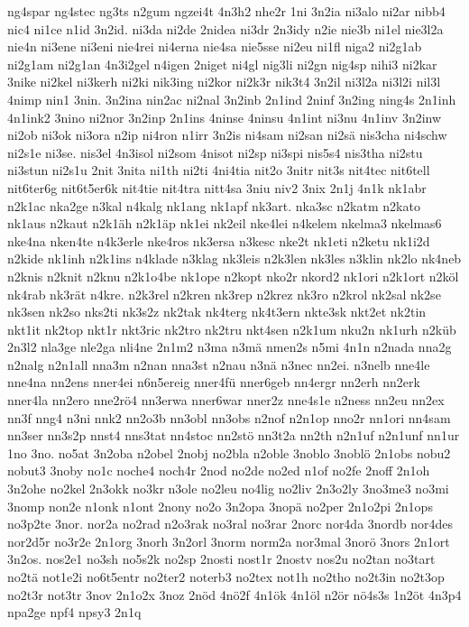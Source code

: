 {ng4spar
ng4stec
ng3ts
n2gum
ngzei4t
4n3h2
nhe2r
1ni
3n2ia
ni3alo
ni2ar
nibb4
nic4
ni1ce
n1id
3n2id.
ni3da
ni2de
2nidea
ni3dr
2n3idy
n2ie
nie3b
ni1el
nie3l2a
nie4n
ni3ene
ni3eni
nie4rei
ni4erna
nie4sa
nie5sse
ni2eu
ni1fl
niga2
ni2g1ab
ni2g1am
ni2g1an
4n3i2gel
n4igen
2niget
ni4gl
nig3li
ni2gn
nig4sp
nihi3
ni2kar
3nike
ni2kel
ni3kerh
ni2ki
nik3ing
ni2kor
ni2k3r
nik3t4
3n2il
ni3l2a
ni3l2i
nil3l
4nimp
nin1
3nin.
3n2ina
nin2ac
ni2nal
3n2inb
2n1ind
2ninf
3n2ing
ning4s
2n1inh
4n1ink2
3nino
ni2nor
3n2inp
2n1ins
4ninse
4ninsu
4n1int
ni3nu
4n1inv
3n2inw
ni2ob
ni3ok
ni3ora
n2ip
ni4ron
n1irr
3n2is
ni4sam
ni2san
ni2sä
nis3cha
ni4schw
ni2s1e
ni3se.
nis3el
4n3isol
ni2som
4nisot
ni2sp
ni3spi
nis5s4
nis3tha
ni2stu
ni3stun
ni2s1u
2nit
3nita
ni1th
ni2ti
4ni4tia
nit2o
3nitr
nit3s
nit4tec
nit6tell
nit6ter6g
nit6t5er6k
nit4tie
nit4tra
nitt4sa
3niu
niv2
3nix
2n1j
4n1k
nk1abr
n2k1ac
nka2ge
n3kal
n4kalg
nk1ang
nk1apf
nk3art.
nka3sc
n2katm
n2kato
nk1aus
n2kaut
n2k1äh
n2k1äp
nk1ei
nk2eil
nke4lei
n4kelem
nkelma3
nkelmas6
nke4na
nken4te
n4k3erle
nke4ros
nk3ersa
n3kesc
nke2t
nk1eti
n2ketu
nk1i2d
n2kide
nk1inh
n2k1ins
n4klade
n3klag
nk3leis
n2k3len
nk3les
n3klin
nk2lo
nk4neb
n2knis
n2knit
n2knu
n2k1o4be
nk1ope
n2kopt
nko2r
nkord2
nk1ori
n2k1ort
n2köl
nk4rab
nk3rät
n4kre.
n2k3rel
n2kren
nk3rep
n2krez
nk3ro
n2krol
nk2sal
nk2se
nk3sen
nk2so
nks2ti
nk3s2z
nk2tak
nk4terg
nk4t3ern
nkte3sk
nkt2et
nk2tin
nkt1it
nk2top
nkt1r
nkt3ric
nk2tro
nk2tru
nkt4sen
n2k1um
nku2n
nk1urh
n2küb
2n3l2
nla3ge
nle2ga
nli4ne
2n1m2
n3ma
n3mä
nmen2s
n5mi
4n1n
n2nada
nna2g
n2nalg
n2n1all
nna3m
n2nan
nna3st
n2nau
n3nä
n3nec
nn2ei.
n3nelb
nne4le
nne4na
nn2ens
nner4ei
n6n5ereig
nner4fü
nner6geb
nn4ergr
nn2erh
nn2erk
nner4la
nn2ero
nne2rö4
nn3erwa
nner6war
nner2z
nne4s1e
n2ness
nn2eu
nn2ex
nn3f
nng4
n3ni
nnk2
nn2o3b
nn3obl
nn3obs
n2nof
n2n1op
nno2r
nn1ori
nn4sam
nn3ser
nn3s2p
nnst4
nns3tat
nn4stoc
nn2stö
nn3t2a
nn2th
n2n1uf
n2n1unf
nn1ur
1no
3no.
no5at
3n2oba
n2obel
2nobj
no2bla
n2oble
3noblo
3noblö
2n1obs
nobu2
nobut3
3noby
no1c
noche4
noch4r
2nod
no2de
no2ed
n1of
no2fe
2noff
2n1oh
3n2ohe
no2kel
2n3okk
no3kr
n3ole
no2leu
no4lig
no2liv
2n3o2ly
3no3me3
no3mi
3nomp
non2e
n1onk
n1ont
2nony
no2o
3n2opa
3nopä
no2per
2n1o2pi
2n1ops
no3p2te
3nor.
nor2a
no2rad
n2o3rak
no3ral
no3rar
2norc
nor4da
3nordb
nor4des
nor2d5r
no3r2e
2n1org
3norh
3n2orl
3norm
norm2a
nor3mal
3norö
3nors
2n1ort
3n2os.
nos2e1
no3sh
no5s2k
no2sp
2nosti
nost1r
2nostv
nos2u
no2tan
no3tart
no2tä
not1e2i
no6t5entr
no2ter2
noterb3
no2tex
not1h
no2tho
no2t3in
no2t3op
no2t3r
not3tr
3nov
2n1o2x
3noz
2nöd
4nö2f
4n1ök
4n1öl
n2ör
nö4s3s
1n2öt
4n3p4
npa2ge
npf4
npsy3
2n1q
}
